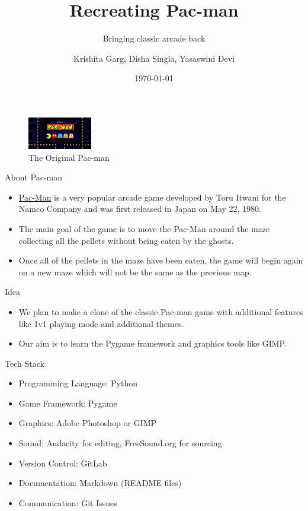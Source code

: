 \documentclass{beamer}
\title{Recreating Pac-man}
\subtitle{Bringing classic arcade back}
\author{Krishita Garg, Disha Singla, Yasaswini Devi}
\date{\today}
\begin{document}
\begin{frame}
	\titlepage	
	\begin{figure}
	\centering
    		\includegraphics[width=0.25\textwidth]{../Assets/Pac-man pic}
		\caption{The Original Pac-man}
	\end{figure}
\end{frame}

\begin{frame}{About Pac-man}
        \begin{itemize}
		\item \href{https://pacman.com/en/}{Pac-Man} is a very popular arcade game developed by Toru Itwani for the Namco Company and was first released in Japan on May 22, 1980. 
		\item The main goal of the game is to move the Pac-Man around the maze collecting all the pellets without being eaten by the ghosts. 
		\item Once all of the pellets in the maze have been eaten, the game will begin again on a new maze which will not be the same as the previous map. 
	\end{itemize}
\end{frame}

\begin{frame}{Idea}
	\begin{itemize}
		\item We plan to make a clone of the classic Pac-man game with additional features like 1v1 playing mode and additional themes. 
		\item Our aim is to learn the Pygame framework and graphics tools like GIMP.
	\end{itemize}
\end{frame}

\begin{frame}{Tech Stack}
        \begin{itemize}
                \item Programming Language: Python
		\item Game Framework: Pygame
		\item Graphics: Adobe Photoshop or GIMP
		\item Sound: Audacity for editing, FreeSound.org for sourcing
		\item Version Control: GitLab
		\item Documentation: Markdown (README files)
		\item Communication: Git Issues
        \end{itemize}
\end{frame}
\end{document}
